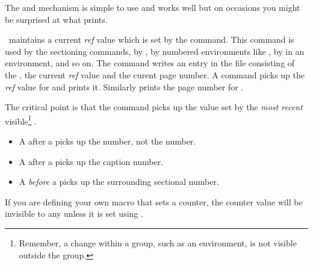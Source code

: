     The \cmd{\label} and \cmd{\ref} mechanism is simple to use and
works well but
on occasions you might be surprised  
at what \cmd{\ref} prints.

    \ltx\ maintains a current \textit{ref} 
value which is 
set by
the  command. This command is used by the sectioning
commands, by \cmd{\caption}, by numbered environments like
, by \cmd{\item} in an  environment, and
so on. The \cmd{\label} command writes an entry in the 
 file consisting of the , the current 
\textit{ref} value and the curent 
page number. 
A \cmd{\ref} command picks up the \textit{ref}
value for  and prints it. Similarly \cmd{\pageref} prints
the page number for .

    The critical point is that the \cmd{\label} command picks up the
value set by the \emph{most recent} visible\footnote{Remember, a
change within a group, such as an environment, is not visible
outside the group.}  . 
\begin{itemize}
\item A \cmd{\label} after a \cmd{\section} picks up the \cmd{\section}
      number, not the \cmd{\chapter} number.
\item A \cmd{\label} after a \cmd{\caption} picks up the caption number.
\item A \cmd{\label} \emph{before} a \cmd{\caption} picks up the surrounding
      sectional number.
\end{itemize}
If you are defining your own macro that sets a counter, the counter value
will be invisible to any \cmd{\label} unless it is 
set using . 



